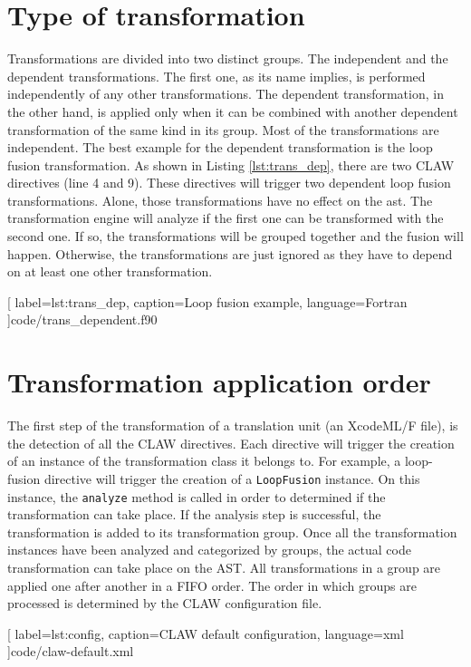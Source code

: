 \documentclass[a4paper, 11pt]{report}
\begin{document}
\section{Type of transformation}
Transformations are divided into two distinct groups. The independent and the 
dependent transformations. The first one, as its name implies, is performed 
independently of any other transformations. The dependent transformation, in the
other hand, is applied only when it can be combined with another dependent 
transformation of the same kind in its group. Most of the transformations are 
independent. The best example for the dependent transformation is the loop 
fusion transformation. As shown in Listing \ref{lst:trans_dep}, there are two 
CLAW directives (line 4 and 9). These directives will trigger two dependent loop
fusion transformations. Alone, those transformations have no effect
on the \gls{ast}. The transformation engine will analyze if the 
first one can be transformed with the second one. If so, the transformations will
be grouped together and the fusion will happen. Otherwise, the transformations 
are just ignored as they have to depend on at least one other transformation.


  [
    label=lst:trans_dep, 
    caption=Loop fusion example, 
    language=Fortran
  ]{code/trans_dependent.f90}

\section{Transformation application order}
The first step of the transformation of a translation unit (an XcodeML/F file), 
is the detection of all the CLAW directives. Each directive will trigger the 
creation of an instance of the transformation class it belongs to. For example,
a loop-fusion directive will trigger the creation of a \lstinline|LoopFusion| 
instance. On this instance, the \lstinline|analyze| method is called in order 
to determined if the transformation can take place. If the analysis step is 
successful, the transformation is added to its transformation group. 
Once all the transformation instances have been analyzed and categorized by 
groups, the actual code transformation can take place on the AST. All 
transformations in a group are applied one after another in a FIFO order. 
The order in which groups are processed is determined by the CLAW configuration
file.


  [
    label=lst:config, 
    caption=CLAW default configuration, 
    language=xml
  ]{code/claw-default.xml}
\end{document}
